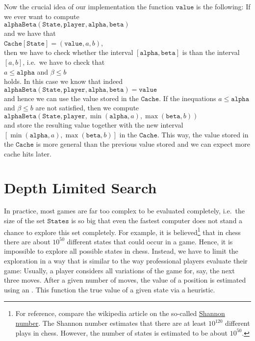 Now the crucial idea of our implementation the function $\mathtt{value}$ is the following:  If we ever want to
compute 
\\[0.2cm]
\hspace*{1.3cm}
$\mathtt{alphaBeta}(\mathtt{State}, \mathtt{player}, \mathtt{alpha}, \mathtt{beta})$
\\[0.2cm]
and we have that 
\\[0.2cm]
\hspace*{1.3cm}
$\mathtt{Cache}[\mathtt{State}] = (\mathtt{value}, a, b)$,
\\[0.2cm]
then we have to check whether the interval $[\mathtt{alpha}, \mathtt{beta}]$ is  than the
interval $[a,b]$, i.e.~we have to check that
\\[0.2cm]
\hspace*{1.3cm}
$a \leq \mathtt{alpha}$ \quad and \quad $\mathtt{\beta} \leq b$ 
\\[0.2cm]
holds.  In this case we know that indeed
\\[0.2cm]
\hspace*{1.3cm}
$\mathtt{alphaBeta}(\mathtt{State}, \mathtt{player}, \mathtt{alpha}, \mathtt{beta}) = \mathtt{value}$
\\[0.2cm]
and hence we can use the value stored in the $\mathtt{Cache}$.  If the inequations $a \leq \mathtt{alpha}$ and
$\mathtt{\beta} \leq b$  are not satisfied, then we compute
\\[0.2cm]
\hspace*{1.3cm}
$\mathtt{alphaBeta}(\mathtt{State}, \mathtt{player}, \min(\mathtt{alpha}, a), \max(\mathtt{beta}, b))$
\\[0.2cm]
and store the resulting value together with the new interval $[\min(\mathtt{alpha}, a), \max(\mathtt{beta},
b)]$ in the $\mathtt{Cache}$. 
This way, the value stored in the $\mathtt{Cache}$ is more general than the previous value stored and we can
expect more cache hits later.

\section{Depth Limited Search}
In practice, most games are far too complex to be evaluated completely, i.e.~the size of the set
$\texttt{States}$ is so big that even the fastest computer does not stand a chance to explore this set
completely.  For example, it is believed\footnote{
  For reference, compare the wikipedia article on the so-called
  \href{https://en.wikipedia.org/wiki/Shannon_number}{Shannon number}.
  The Shannon number estimates that there are at least $10^{120}$ different plays in chess.  However, the
  number of states is estimated to be about $10^{50}$. 
}
that in chess there are about $10^{50}$ different states that could occur in a game.
Hence, it is impossible to explore all possible states in chess.  Instead, we have to limit
the exploration in a way that is similar to the way professional players evaluate their game:  Usually, a
player considers all variations of the game for, say, the next three moves.  After a given number of moves, the
value of a position is estimated using an .  This function  the true
value of a given state via a heuristic.

